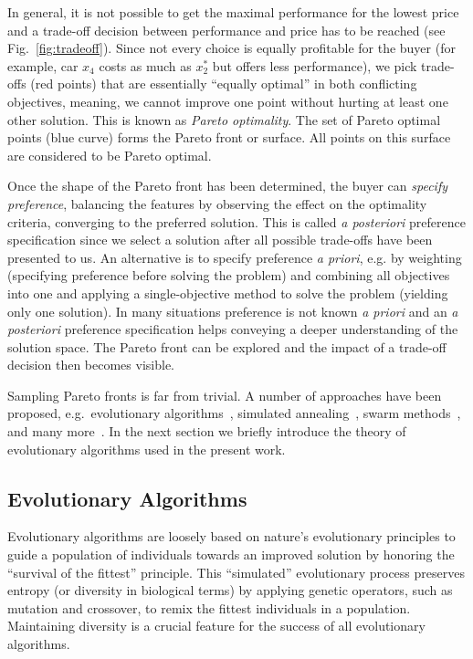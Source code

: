 \documentclass[%
reprint,
amsmath,amssymb,
aps,
prstab,
]{revtex4-1}
\begin{document}
In general, it is not possible to get the maximal performance for the lowest
  price and a trade-off decision between performance and price has to be
  reached (see Fig.~\ref{fig:tradeoff}).
Since not every choice is equally profitable for the buyer (for example, car
  $x_4$ costs as much as $x_2^*$ but offers less performance), we pick
  trade-offs (red points) that are essentially ``equally optimal'' in both
  conflicting objectives, meaning, we cannot improve one point without hurting
  at least one other solution.
This is known as \textit{Pareto optimality}.
The set of Pareto optimal points (blue curve) forms the Pareto front or
  surface.
All points on this surface are considered to be Pareto optimal.

Once the shape of the Pareto front has been determined, the buyer can
  \textit{specify preference}, balancing the features by observing the
  effect on the optimality criteria, converging to the preferred solution.
This is called \textit{a posteriori} preference specification since we select
  a solution after all possible trade-offs have been presented to us.
An alternative is to specify preference \textit{a priori}, e.g. by
  weighting (specifying preference before solving the problem) and combining
  all objectives into one and applying a single-objective method to solve the
  problem (yielding only one solution).
In many situations preference is not known \textit{a priori} and an
  \textit{a posteriori} preference specification helps conveying a deeper
  understanding of the solution space.
The Pareto front can be explored and the impact of a trade-off decision then
  becomes visible.

Sampling Pareto fronts is far from trivial.
A number of approaches have been proposed,
  e.g.\ evolutionary algorithms~\cite{deb:09},
  simulated annealing~\cite{kigv:83},
  swarm methods~\cite{keeb:95},
  and many more~\cite{domc:96,cati:02,kara:05,hoss:09}.
In the next section we briefly introduce the theory of evolutionary algorithms
  used in the present work.


\subsection{Evolutionary Algorithms}

Evolutionary algorithms are loosely based on nature's evolutionary
  principles to guide a population of individuals towards an improved solution
  by honoring the ``survival of the fittest'' principle.
This ``simulated'' evolutionary process preserves entropy (or diversity in
  biological terms) by applying genetic operators, such as mutation and
  crossover, to remix the fittest individuals in a population.
Maintaining diversity is a crucial feature for the success of all evolutionary
  algorithms.
\end{document}

